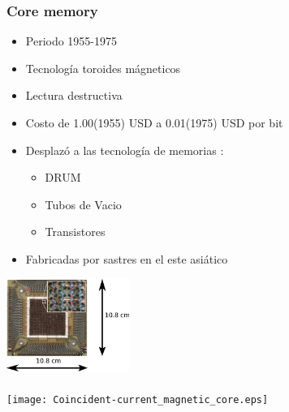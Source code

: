 \documentclass{beamer}
\begin{document}
\begin{frame}
\frametitle{Core memory}
\begin{minipage}[c]{7.5cm}
	\begin{itemize}
		\item Periodo 1955-1975
		\item Tecnología toroides mágneticos
		\item Lectura destructiva
		\item Costo de 1.00(1955) USD a 0.01(1975) USD por bit
		\item Desplazó a las tecnología de memorias :
			\begin{itemize}
				\item DRUM
				\item Tubos de Vacio
				\item Transistores
			\end{itemize}
		\item Fabricadas por sastres en el este asiático
	\end{itemize}
\end{minipage}
\begin{minipage}[c]{4cm}
	\includegraphics[width=4cm]{Ferrite_core_memory.eps} \\ \\
	\texttt{[image: Coincident-current\_magnetic\_core.eps]}
\end{minipage}
\end{frame}
\end{document}
